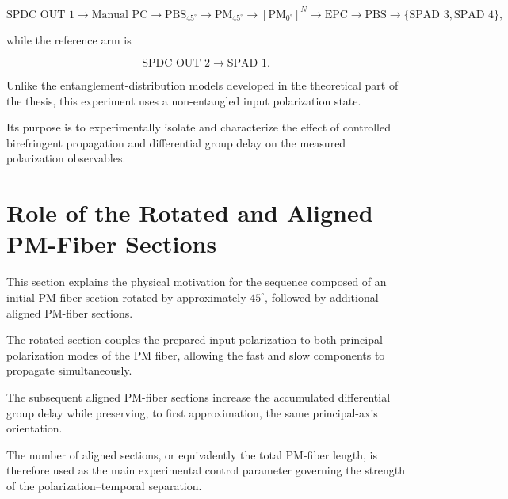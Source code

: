\begin{equation}
\text{SPDC OUT 1}
\rightarrow
\text{Manual PC}
\rightarrow
\text{PBS}_{45^\circ}
\rightarrow
\text{PM}_{45^\circ}
\rightarrow
[\text{PM}_{0^\circ}]^{N}
\rightarrow
\text{EPC}
\rightarrow
\text{PBS}
\rightarrow
\{\text{SPAD 3},\text{SPAD 4}\},
\end{equation}

while the reference arm is

\begin{equation}
\text{SPDC OUT 2}
\rightarrow
\text{SPAD 1}.
\end{equation}

Unlike the entanglement-distribution models developed in the theoretical part of
the thesis, this experiment uses a non-entangled input polarization state.

Its purpose is to experimentally isolate and characterize the effect of
controlled birefringent propagation and differential group delay on the measured
polarization observables.



\section{Role of the Rotated and Aligned PM-Fiber Sections}
\label{sec:pm_fiber_configuration}

This section explains the physical motivation for the sequence composed of an
initial PM-fiber section rotated by approximately \(45^\circ\), followed by
additional aligned PM-fiber sections.

The rotated section couples the prepared input polarization to both principal
polarization modes of the PM fiber, allowing the fast and slow components to
propagate simultaneously.

The subsequent aligned PM-fiber sections increase the accumulated differential
group delay while preserving, to first approximation, the same principal-axis
orientation.

The number of aligned sections, or equivalently the total PM-fiber length, is
therefore used as the main experimental control parameter governing the strength
of the polarization--temporal separation.



